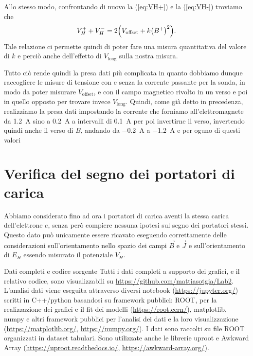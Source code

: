 \documentclass[
    prl,
    reprint, 
    superscriptaddress, 
    altaffilletter, 
    amsmath, 
    amssymb, 
    a4paper,
    varvw]{revtex4-2}
\begin{document}
Allo stesso modo, confrontando di nuovo la (\ref{eq:VH+}) e la (\ref{eq:VH-}) troviamo che \begin{equation}
    V_H^+ + V_H^-= 2\qty(V_\text{offset} + k\qty(B^+)^2).
\end{equation}
Tale relazione ci permette quindi di poter fare una misura quantitativa del valore di $k$ e perciò anche dell'effetto di $V_\text{long}$ sulla nostra misura. 

Tutto ciò rende quindi la presa dati più complicata in quanto dobbiamo dunque raccogliere le misure di tensione con e senza la corrente passante per la sonda, in modo da poter misurare $V_\text{offset}$, e con il campo magnetico rivolto in un verso e poi in quello opposto per trovare invece $V_\text{long}$. Quindi, come già detto in precedenza, realizziamo la presa dati impostando la corrente che forniamo all'elettromagnete da \SI{1.2}{\ampere} sino a \SI{0.2}{\ampere} a intervalli di \SI{0.1}{\ampere} per poi invertirne il verso, invertendo quindi anche il verso di $B$, andando da \SI{-0.2}{\ampere} a \SI{-1.2}{\ampere} e per oguno di questi valori 


\section{Verifica del segno dei portatori di carica}
Abbiamo considerato fino ad ora i portatori di carica aventi la stessa carica dell'elettrone $e$, senza però compiere nessuna ipotesi sul segno dei portatori stessi. Questo dato può unicamente essere ricavato eseguendo correttamente delle considerazioni sull'orientamento nello spazio dei campi $\vec{B}$ e $\vec{J}$ e sull'orientamento di $E_H$ essendo misurato il potenziale $V_H$. 


\begin{methods}{D\lowercase{ati completi e codice sorgente}}
    Tutti i dati completi a supporto dei grafici, e il relativo codice, sono visualizzabili su \url{https://github.com/mattiasotgia/Lab2}. L'analisi dati viene eseguita attraverso diversi notebook (\url{https://jupyter.org/}) scritti in C++/python basandosi su framework pubblici: ROOT, per la realizzazione dei grafici e il fit dei modelli (\url{https://root.cern/}), matplotlib, numpy e altri framework pubblici per l'analisi dei dati e la loro visualizzazione (\url{https://matplotlib.org/}, \url{https://numpy.org/}). I dati sono raccolti su file ROOT organizzati in dataset tabulari. Sono utilizzate anche le librerie uproot e Awkward Array (\url{https://uproot.readthedocs.io/}, \url{https://awkward-array.org/}).
\end{methods}
\end{document}
